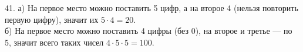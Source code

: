 41. а) На первое место можно поставить 5 цифр, а на второе 4 (нельзя повторить первую цифру), значит их $5\cdot4=20.$\\
б) На первое место можно поставить 4 цифры (без 0), на второе и третье --- по 5, значит всего таких чисел $4\cdot5\cdot5=100.$\\
